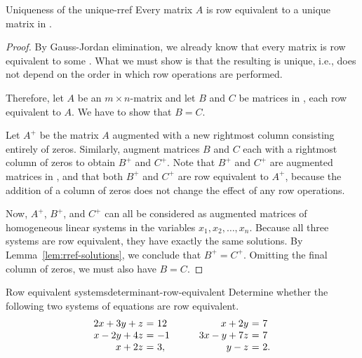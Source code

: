 \begin{theorem}{Uniqueness of the {\rref}}{unique-rref}
  Every matrix $A$ is row equivalent to a unique matrix in {\rref}.
\end{theorem}

\begin{proof}
  By Gauss-Jordan elimination, we already know that every matrix is
  row equivalent to some {\rref}. What we must show is that the
  resulting {\rref} is unique, i.e., does not depend on the order in
  which row operations are performed.

  Therefore, let $A$ be an $m \times n$-matrix and let $B$ and $C$ be
  matrices in {\rref}, each row equivalent to $A$. We have to show
  that $B=C$.

  Let $A^{+}$ be the matrix $A$ augmented with a new rightmost column
  consisting entirely of zeros. Similarly, augment matrices $B$ and
  $C$ each with a rightmost column of zeros to obtain $B^{+}$ and
  $C^{+}$. Note that $B^{+}$ and $C^{+}$ are augmented matrices in
  {\rref}, and that both $B^{+}$ and $C^{+}$ are row equivalent to
  $A^{+}$, because the addition of a column of zeros does not change
  the effect of any row operations.

  Now, $A^{+}$, $B^{+}$, and $C^{+}$ can all be considered as
  augmented matrices of homogeneous linear systems in the variables
  $x_1, x_2,\ldots, x_n$. Because all three systems are row
  equivalent, they have exactly the same solutions. By
  Lemma~\ref{lem:rref-solutions}, we conclude that $B^{+}=C^{+}$.
  Omitting the final column of zeros, we must also have $B=C$.
\end{proof}

\begin{example}{Row equivalent systems}{determinant-row-equivalent}
  Determine whether the following two systems of equations are row
  equivalent.
  \begin{equation*}
    \begin{array}{r@{~}c@{~}l}
      2x + 3y + z &=& 12 \\
      x - 2y + 4z &=& -1 \\
      x + 2z &=& 3,
    \end{array}
    \quad\quad
    \begin{array}{r@{~}c@{~}l}
      x + 2y &=& 7 \\
      3x - y + 7z &=& 7 \\
      y - z &=& 2.
    \end{array}
  \end{equation*}
\end{example}

